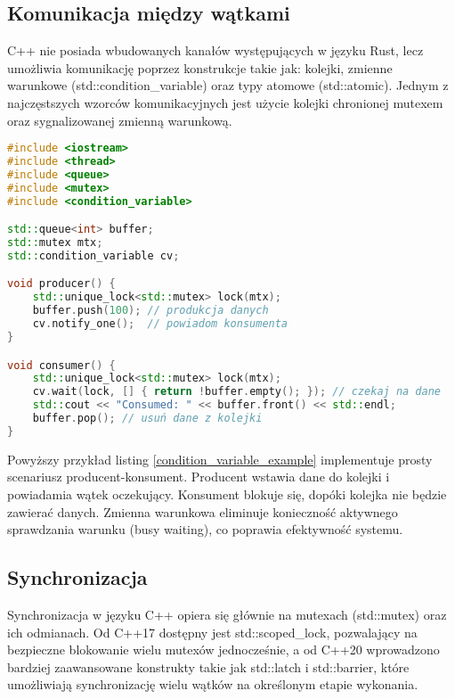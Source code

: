 \subsection{Komunikacja między wątkami}
C++ nie posiada wbudowanych kanałów  występujących w języku Rust, lecz umożliwia komunikację poprzez konstrukcje takie jak: kolejki, zmienne warunkowe (std::condition\_variable) oraz typy atomowe (std::atomic). Jednym z najczęstszych wzorców komunikacyjnych jest użycie kolejki chronionej mutexem oraz sygnalizowanej zmienną warunkową.
\begin{lstlisting}[language=C++, caption={Przykład komunikacji między wątkami}, label={condition_variable_example}]
#include <iostream>
#include <thread>
#include <queue>
#include <mutex>
#include <condition_variable>

std::queue<int> buffer;
std::mutex mtx;
std::condition_variable cv;

void producer() {
    std::unique_lock<std::mutex> lock(mtx);
    buffer.push(100); // produkcja danych
    cv.notify_one();  // powiadom konsumenta
}

void consumer() {
    std::unique_lock<std::mutex> lock(mtx);
    cv.wait(lock, [] { return !buffer.empty(); }); // czekaj na dane
    std::cout << "Consumed: " << buffer.front() << std::endl;
    buffer.pop(); // usuń dane z kolejki
}
\end{lstlisting}
Powyższy przykład listing \ref{condition_variable_example} implementuje prosty scenariusz producent-konsument. Producent wstawia dane do kolejki i powiadamia wątek oczekujący. Konsument blokuje się, dopóki kolejka nie będzie zawierać danych. Zmienna warunkowa eliminuje konieczność aktywnego sprawdzania warunku (busy waiting), co poprawia efektywność systemu.


\subsection{Synchronizacja}
Synchronizacja w języku C++ opiera się głównie na mutexach (std::mutex) oraz ich odmianach. Od C++17 dostępny jest std::scoped\_lock, pozwalający na bezpieczne blokowanie wielu mutexów jednocześnie, a od C++20 wprowadzono bardziej zaawansowane konstrukty takie jak std::latch i std::barrier, które umożliwiają synchronizację wielu wątków na określonym etapie wykonania.

